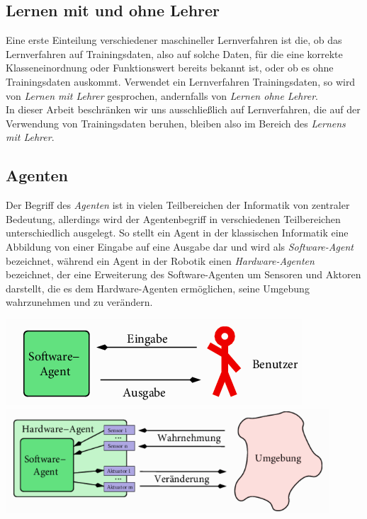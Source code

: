 \documentclass[a4paper]{scrartcl}
\newenvironment{Figure}
  {\par\medskip\noindent\minipage{\linewidth}}
  {\endminipage\par\medskip}
\begin{document}
\begin{multicols}{2}
            \subsection{Lernen mit und ohne Lehrer}
                Eine erste Einteilung verschiedener maschineller Lernverfahren ist die, ob das Lernverfahren auf Trainingsdaten, also auf solche Daten, für die eine korrekte Klasseneinordnung oder Funktionswert bereits bekannt ist, oder ob es ohne Trainingsdaten auskommt. Verwendet ein Lernverfahren Trainingsdaten, so wird von \emph{Lernen mit Lehrer} gesprochen, andernfalls von \emph{Lernen ohne Lehrer}.\\
                In dieser Arbeit beschränken wir uns ausschließlich auf Lernverfahren, die auf der Verwendung von Trainingsdaten beruhen, bleiben also im Bereich des \emph{Lernens mit Lehrer}.
            \subsection{Agenten}
                Der Begriff des \emph{Agenten} ist in vielen Teilbereichen der Informatik von zentraler Bedeutung, allerdings wird der Agentenbegriff in verschiedenen Teilbereichen unterschiedlich ausgelegt. So stellt ein Agent in der klassischen Informatik eine Abbildung von einer Eingabe auf eine Ausgabe dar und wird als \emph{Software-Agent} bezeichnet, während ein Agent in der Robotik einen \emph{Hardware-Agenten} bezeichnet, der eine Erweiterung des Software-Agenten um Sensoren und Aktoren darstellt, die es dem Hardware-Agenten ermöglichen, seine Umgebung wahrzunehmen und zu verändern. \cite{ertel2016}
                \begin{Figure}
                    \centering
                    \includegraphics[width=\linewidth]{softwareagent.png}
                    \includegraphics[width=\linewidth]{hardwareagent.png}

\end{Figure}
\end{multicols}
\end{document}
